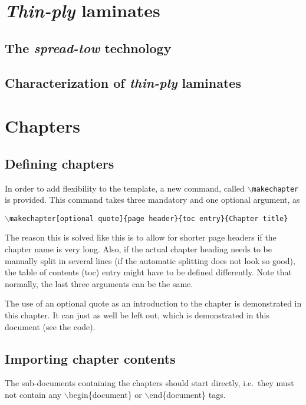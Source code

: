\section{\emph{Thin-ply} laminates}

\subsection{The \emph{spread-tow} technology}



\subsection{Characterization of \emph{thin-ply} laminates}



\section{Chapters}
\subsection{Defining chapters}
In order to add flexibility to the template, a new command, called \texttt{$\backslash$makechapter} is provided. This command takes three mandatory and one optional argument, as 
\begin{center}
	\texttt{$\backslash$makechapter[optional quote]\{page header\}\{toc entry\}\{Chapter title\}}
\end{center}

The reason this is solved like this is to allow for shorter page headers if the chapter name is very long. Also, if the actual chapter heading needs to be manually split in several lines (if the automatic splitting does not look so good), the table of contents (toc) entry might have to be defined differently. Note that normally, the last three arguments can be the same. 

The use of an optional quote as an introduction to the chapter is demonstrated in this chapter. It can just as well be left out, which is demonstrated in this document (see the code).

\subsection{Importing chapter contents}
The sub-documents containing the chapters should start directly, i.e.\ they must not contain any $\backslash$begin\{document\} or $\backslash$end\{document\} tags.

